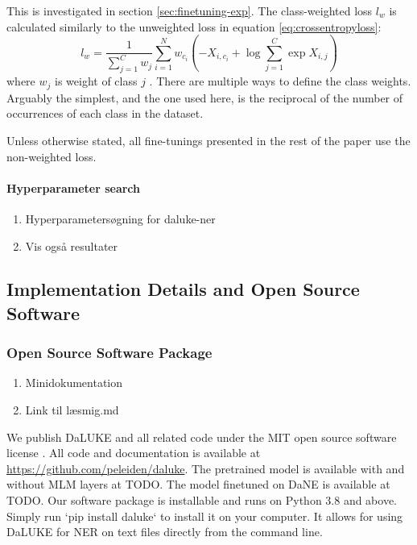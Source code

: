 \documentclass[main.tex]{subfiles}
\begin{document}
This is investigated in section \ref{sec:finetuning-exp}.
The class-weighted loss $ l_w $ is calculated similarly to the unweighted loss in equation \eqref{eq:crossentropyloss}:
\begin{equation}\label{eq:w-crossentropyloss}
    l_w = \frac{1}{\sum_{j=1}^{C} w_j}
    \sum_{i=1}^N w_{c_i} \left(
        -X_{i, c_i} + \log \sum_{j=1}^C \exp X_{i, j}
    \right)
\end{equation}
where $ w_j $ is weight of class $ j $ \cite{pytorchcel}.
There are multiple ways to define the class weights.
Arguably the simplest, and the one used here, is the reciprocal of the number of occurrences of each class in the dataset.

Unless otherwise stated, all fine-tunings presented in the rest of the paper use the non-weighted loss.

\paragraph{Hyperparameter search}

\begin{enumerate}
    \item Hyperparametersøgning for daluke-ner
    \item Vis også resultater
\end{enumerate}
\subsection{Implementation Details and Open Source Software}%
\label{sub:oss}

\subsubsection{Open Source Software Package}
\begin{enumerate}
    \item Minidokumentation
    \item Link til læsmig.md
\end{enumerate}
We publish DaLUKE and all related code under the MIT open source software license \cite{mitlicense}.
All code and documentation is available at \url{https://github.com/peleiden/daluke}.
The pretrained model is available with and without MLM layers at TODO.
The model finetuned on DaNE is available at TODO.
Our software package is  installable and runs on Python 3.8 and above.
Simply run `pip install daluke` to install it on your computer.
It allows for using DaLUKE for NER on text files directly from the command line.
\end{document}
